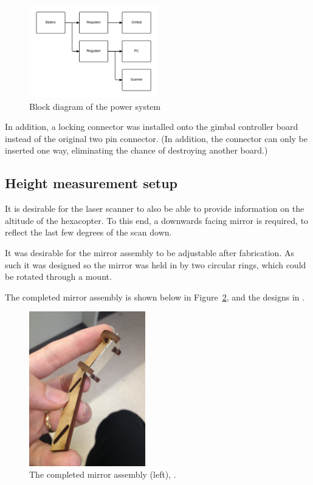 \documentclass[12pt,oneside,a4paper]{book}
\begin{document}
\begin{figure}[h!]
  \centering
  \includegraphics[width=0.5\textwidth]{figs/power}
  \caption{Block diagram of the power system}
  \label{fig:power}
\end{figure}

In addition, a locking connector was installed onto the gimbal
controller board instead of the original two pin connector. (In
addition, the connector can only be inserted one way, eliminating the
chance of destroying another board.)

\subsection{Height measurement setup}
\label{sec:height-meas-setup}

It is desirable for the laser scanner to also be able to provide
information on the altitude of the hexacopter. To this end, a
downwards facing mirror is required, to reflect the last few degrees
of the scan down.

It was desirable for the mirror assembly to be adjustable after
fabrication. As such it was designed so the mirror was held in by two
circular rings, which could be rotated through a mount.

The completed mirror assembly is shown below in
Figure~\ref{fig:mirror}, and the designs in .

\begin{figure}[h!]
  \centering
  \includegraphics[width=0.45\textwidth]{figs/mirror}
  \caption{The completed mirror assembly (left), .}
  \label{fig:mirror}
\end{figure}
\end{document}
